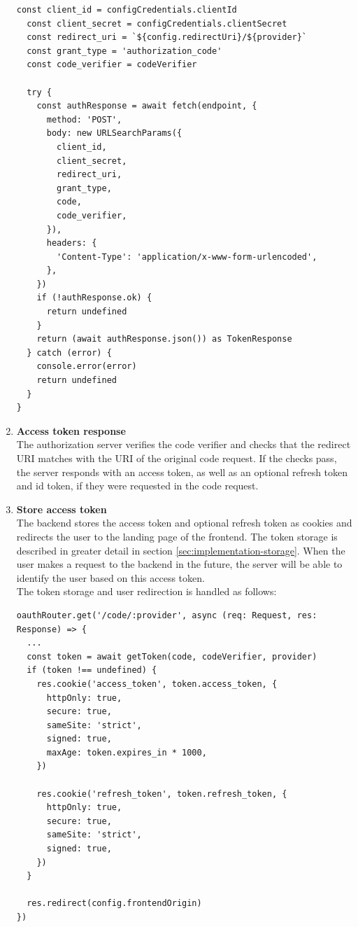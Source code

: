 \begin{enumerate}
\begin{lstlisting}[style=ES6, caption={Function used to request an access token and refresh token}]
  const client_id = configCredentials.clientId
  const client_secret = configCredentials.clientSecret
  const redirect_uri = `${config.redirectUri}/${provider}`
  const grant_type = 'authorization_code'
  const code_verifier = codeVerifier

  try {
    const authResponse = await fetch(endpoint, {
      method: 'POST',
      body: new URLSearchParams({
        client_id,
        client_secret,
        redirect_uri,
        grant_type,
        code,
        code_verifier,
      }),
      headers: {
        'Content-Type': 'application/x-www-form-urlencoded',
      },
    })
    if (!authResponse.ok) {
      return undefined
    }
    return (await authResponse.json()) as TokenResponse
  } catch (error) {
    console.error(error)
    return undefined
  }
}
\end{lstlisting}
    \item \textbf{Access token response} \\
    The authorization server verifies the code verifier and checks that the redirect URI matches with the URI of the original code request.
    If the checks pass, the server responds with an access token, as well as an optional refresh token and id token, if they were requested in the code request.
    \item \textbf{Store access token} \\
    The backend stores the access token and optional refresh token as cookies and redirects the user to the landing page of the frontend.
    The token storage is described in greater detail in section \ref{sec:implementation-storage}.
    When the user makes a request to the backend in the future, the server will be able to identify the user based on this access token. \\
    The token storage and user redirection is handled as follows:
\begin{lstlisting}[style=ES6, caption={Part of the backend code callback route that deals with storing tokens and redirecting the user to the frontend}]
oauthRouter.get('/code/:provider', async (req: Request, res: Response) => {
  ...
  const token = await getToken(code, codeVerifier, provider)
  if (token !== undefined) {
    res.cookie('access_token', token.access_token, {
      httpOnly: true,
      secure: true,
      sameSite: 'strict',
      signed: true,
      maxAge: token.expires_in * 1000,
    })

    res.cookie('refresh_token', token.refresh_token, {
      httpOnly: true,
      secure: true,
      sameSite: 'strict',
      signed: true,
    })
  }

  res.redirect(config.frontendOrigin)
})
\end{lstlisting}
\end{enumerate}

